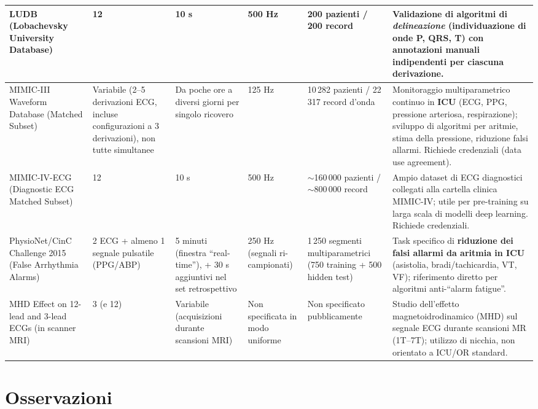\documentclass[11pt,a4paper]{article}
\begin{document}
\begin{longtable}{P{3.2cm}P{1.6cm}P{2.0cm}P{1.6cm}P{1.6cm}P{5.5cm}}
LUDB (Lobachevsky University Database) &
12 &
10 s &
500 Hz &
200 pazienti / 200 record &
Validazione di algoritmi di \emph{delineazione} (individuazione di onde P, QRS, T) con annotazioni manuali indipendenti per ciascuna derivazione. \\
\midrule

MIMIC-III Waveform Database (Matched Subset) &
Variabile (2--5 derivazioni ECG, incluse configurazioni a 3 derivazioni), non tutte simultanee &
Da poche ore a diversi giorni per singolo ricovero &
125 Hz &
10\,282 pazienti / 22\,317 record d'onda &
Monitoraggio multiparametrico continuo in \textbf{ICU} (ECG, PPG, pressione arteriosa, respirazione); sviluppo di algoritmi per aritmie, stima della pressione, riduzione falsi allarmi. Richiede credenziali (data use agreement). \\
\midrule

MIMIC-IV-ECG (Diagnostic ECG Matched Subset) &
12 &
10 s &
500 Hz &
$\sim$160\,000 pazienti / $\sim$800\,000 record &
Ampio dataset di ECG diagnostici collegati alla cartella clinica MIMIC-IV; utile per pre-training su larga scala di modelli deep learning. Richiede credenziali. \\
\midrule

PhysioNet/CinC Challenge 2015 (False Arrhythmia Alarms) &
2 ECG + almeno 1 segnale pulsatile (PPG/ABP) &
5 minuti (finestra ``real-time''), + 30 s aggiuntivi nel set retrospettivo &
250 Hz (segnali ri-campionati) &
1\,250 segmenti multiparametrici (750 training + 500 hidden test) &
Task specifico di \textbf{riduzione dei falsi allarmi da aritmia in ICU} (asistolia, bradi/tachicardia, VT, VF); riferimento diretto per algoritmi anti-``alarm fatigue''. \\
\midrule

MHD Effect on 12-lead and 3-lead ECGs (in scanner MRI) &
3 (e 12) &
Variabile (acquisizioni durante scansioni MRI) &
Non specificata in modo uniforme &
Non specificato pubblicamente &
Studio dell'effetto magnetoidrodinamico (MHD) sul segnale ECG durante scansioni MR (1T--7T); utilizzo di nicchia, non orientato a ICU/OR standard. \\

\bottomrule
\end{longtable}

\section*{Osservazioni}
\end{document}
